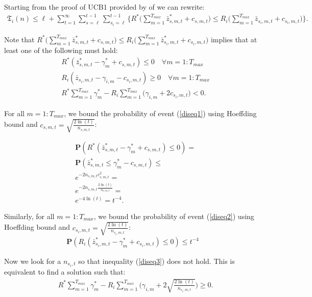Starting from the proof of UCB1 provided by of \cite{auer2002finite} we can rewrite:
\begin{align}
	\mathfrak{T}_i(n) \leq \ell + \sum_{t=1}^\infty \sum_{s=\ell}^{t-1} \sum_{s_i=\ell}^{t-1} \Biggl\{ R^*\Bigg(\sum_{m=1}^{T_{max}}\bar{z}^*_{s,m,t} + c_{s,m,t}\Bigg) \le R_i\Bigg(\sum_{m=1}^{T_{max}}\bar{z}_{s_i,m,t} + c_{s_i,m,t}\Bigg) \Biggl\}. 
\end{align}

Note that $R^*\big(\sum_{m=1}^{T_{max}}\bar{z}^*_{s,m,t} + c_{s,m,t}\big) \le R_i\big(\sum_{m=1}^{T_{max}}\bar{z}^*_{s_i,m,t} + c_{s_i,m,t}\big)$ implies that at least one of the following must hold:
\begin{align}
	&R^*(\bar{z}^*_{s,m,t} - \gamma^*_m + c_{s,m,t}) \le 0 \quad \forall m=1:T_{max} \label{diseq1}\\
	&R_i(\bar{z}_{s_i,m,t} - \gamma_{i,m} - c_{s_i,m,t}) \ge 0 \quad \forall m=1:T_{max} \label{diseq2}\\
	&R^*\sum_{m=1}^{T_{max}}\gamma^*_{m} - R_i \sum_{m=1}^{T_{max}}\Bigg( \gamma_{i,m} +2c_{s_i,m,t}\Bigg) < 0 \label{diseq3}.
\end{align}

For all $m=1:T_{max}$, we bound the probability of event (\ref{diseq1}) using Hoeffding bound and $c_{s,m,t}=\sqrt{\frac{2\ln(t)}{n_{s,m,t}}}$:

\begin{align}
	&\mathbf{P}(R^*(\bar{z}^*_{s,m,t} - \gamma^*_m + c_{s,m,t}) \le 0) = \nonumber\\
	&\mathbf{P}(\bar{z}^*_{s,m,t} \le \gamma^*_m - c_{s,m,t}) \le \nonumber\\
	&e^{-2 n_{s,m,t} c^2_{s,m,t}} = \nonumber\\
	&e^{-2 n_{s,m,t} \frac{2\ln(t)}{n_{s,m,t}}} = \nonumber\\
	&e^{-4\ln(t)} = t^{-4}.
\end{align}

Similarly, for all $m=1:T_{max}$, we bound the probability of event (\ref{diseq2}) using Hoeffding bound and $c_{s_i,m,t}=\sqrt{\frac{2\ln(t)}{n_{s_i,m,t}}}$:
\begin{align}
	\mathbf{P}(R_i(\bar{z}^*_{s_i,m,t} - \gamma^*_m + c_{s_i,m,t}) \le 0) \le t^{-4}
\end{align}

Now we look for a $n_{s_i,t}$ so that inequality (\ref{diseq3}) does not hold. This is equivalent to find a solution such that:
\begin{align}
	&R^*\sum_{m=1}^{T_{max}}\gamma^*_{m} - R_i \sum_{m=1}^{T_{max}}\Bigg( \gamma_{i,m} +2\sqrt{\frac{2\ln(t)}{n_{s_i,m,t}}}\Bigg) \ge 0 \label{ineq_mag}.
\end{align}


